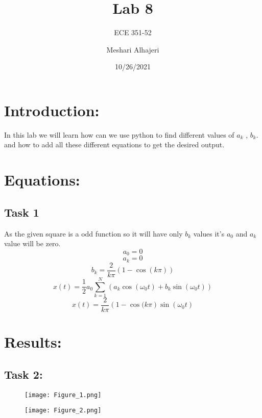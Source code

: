 \documentclass{article}
\title{Lab 8}
\author{ECE 351-52}
\author{Meshari Alhajeri}
\date{10/26/2021}
\begin{document}
\maketitle

\section{Introduction:}
In this lab we will learn how can we use python to find different values of $a_k$ , $b_k$. and how to add all these different equations to get the desired output.
\section{Equations:}
\subsection{Task 1}
As the given square is a odd function so it will have only $b_k$ values it's $a_0$ and $a_k$ value will be zero.
$$a_0 = 0$$
$$a_k = 0$$
$$b_k = \frac{2}{k \pi}\left(1- \cos (k \pi) \right)$$
$$x(t) = \frac{1}{2}a_0 \sum_{k=1}^{N}\left( a_k \cos(\omega_0 t ) + b_k \sin(\omega_0 t ) \right)$$
$$x(t) = \frac{2}{k \pi}\left(1- \cos (k \pi \right) \sin(\omega_0 t ) $$

\section{Results: }
\subsection{Task 2:}
\begin{figure}[H]
\centering
\texttt{[image: Figure\_1.png]}

\end{figure}

\begin{figure}[H]
\centering
\texttt{[image: Figure\_2.png]}

\end{figure}
\end{document}
